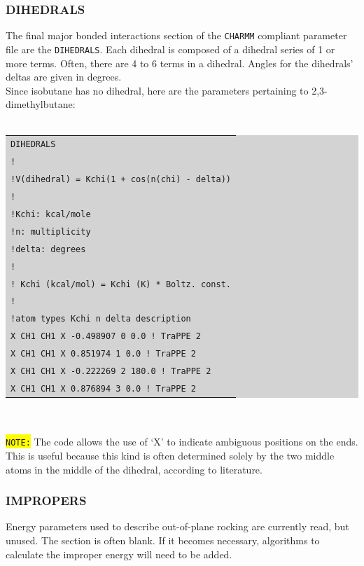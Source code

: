 \subsubsection{DIHEDRALS}
The final major bonded interactions section of the \texttt{CHARMM} compliant parameter file are the \texttt{DIHEDRALS}. Each dihedral is composed of a dihedral series of 1 or more terms. Often, there are 4 to 6 terms in a dihedral. Angles for the dihedrals' deltas are given in degrees.\\
Since isobutane has no dihedral, here are the parameters pertaining to 2,3-dimethylbutane:\\\\
\colorbox{lightgray}{
\begin{tabular}{l}
\texttt{DIHEDRALS}\\
\texttt{!}\\
\texttt{!V(dihedral) = Kchi(1 + cos(n(chi) - delta))}\\
\texttt{!}\\
\texttt{!Kchi: kcal/mole}\\
\texttt{!n: multiplicity}\\
\texttt{!delta: degrees}\\
\texttt{!}\\
\texttt{! Kchi (kcal/mol) = Kchi (K) * Boltz. const.}\\
\texttt{!}\\
\texttt{!atom types         Kchi        n    delta              description}\\
\texttt{X   CH1 CH1 X      -0.498907    0       0.0              ! TraPPE 2}\\
\texttt{X   CH1 CH1 X       0.851974    1       0.0              ! TraPPE 2}\\
\texttt{X   CH1 CH1 X      -0.222269    2   180.0              ! TraPPE 2}\\
\texttt{X   CH1 CH1 X       0.876894    3       0.0              ! TraPPE 2}\\
\end{tabular}}\\\\
\colorbox{yellow}{\texttt{NOTE:}} The code allows the use of `X' to indicate ambiguous positions on the ends. This is useful because this kind is often determined solely by the two middle atoms in the middle of the dihedral, according to literature.
\subsubsection{IMPROPERS}
Energy parameters used to describe out-of-plane rocking are currently read, but unused. The section is often blank. If it becomes necessary, algorithms to calculate the improper energy will need to be added.\\

